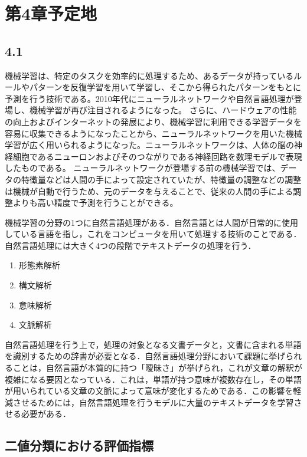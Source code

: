 \chapter{第4章予定地\label{c4}}

\section{4.1\label{c4s1}}
機械学習は、特定のタスクを効率的に処理するため、あるデータが持っているルールやパターンを反復学習を用いて学習し、そこから得られたパターンをもとに予測を行う技術である。2010年代にニューラルネットワークや自然言語処理が登場し、機械学習が再び注目されるようになった。
さらに、ハードウェアの性能の向上およびインターネットの発展により、機械学習に利用できる学習データを容易に収集できるようになったことから、ニューラルネットワークを用いた機械学習が広く用いられるようになった。ニューラルネットワークは、人体の脳の神経細胞であるニューロンおよびそのつながりである神経回路を数理モデルで表現したものである。
ニューラルネットワークが登場する前の機械学習では、データの特徴量などは人間の手によって設定されていたが、特徴量の調整などの調整は機械が自動で行うため、元のデータを与えることで、従来の人間の手による調整よりも高い精度で予測を行うことができる。

機械学習の分野の1つに自然言語処理がある．自然言語とは人間が日常的に使用している言語を指し，これをコンピュータを用いて処理する技術のことである．自然言語処理には大きく4つの段階でテキストデータの処理を行う．

\begin{enumerate}
    \item 形態素解析
    \item 構文解析
    \item 意味解析
    \item 文脈解析
\end{enumerate}

自然言語処理を行う上で，処理の対象となる文書データと，文書に含まれる単語を識別するための辞書が必要となる．自然言語処理分野において課題に挙げられることは，自然言語が本質的に持つ「曖昧さ」が挙げられ，これが文章の解釈が複雑になる要因となっている．これは，単語が持つ意味が複数存在し，その単語が用いられている文章の文脈によって意味が変化するためである．この影響を軽減させるためには，自然言語処理を行うモデルに大量のテキストデータを学習させる必要がある．

\section{二値分類における評価指標 \label{c4s2}}


